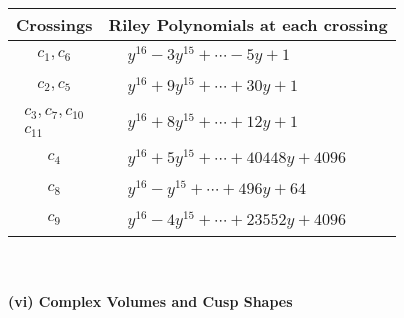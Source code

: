\documentclass[1p]{elsarticle_modified}
\theoremstyle{definition}
\begin{document}
\begin{tabular}{m{50pt}|m{274pt}}
Crossings & \hspace{64pt}Riley Polynomials at each crossing \\
\hline $$\begin{aligned}c_{1},c_{6}\end{aligned}$$&$\begin{aligned}
&y^{16}-3 y^{15}+\cdots-5 y+1
\end{aligned}$\\
\hline $$\begin{aligned}c_{2},c_{5}\end{aligned}$$&$\begin{aligned}
&y^{16}+9 y^{15}+\cdots+30 y+1
\end{aligned}$\\
\hline $$\begin{aligned}c_{3},c_{7},c_{10}\\c_{11}\end{aligned}$$&$\begin{aligned}
&y^{16}+8 y^{15}+\cdots+12 y+1
\end{aligned}$\\
\hline $$\begin{aligned}c_{4}\end{aligned}$$&$\begin{aligned}
&y^{16}+5 y^{15}+\cdots+40448 y+4096
\end{aligned}$\\
\hline $$\begin{aligned}c_{8}\end{aligned}$$&$\begin{aligned}
&y^{16}- y^{15}+\cdots+496 y+64
\end{aligned}$\\
\hline $$\begin{aligned}c_{9}\end{aligned}$$&$\begin{aligned}
&y^{16}-4 y^{15}+\cdots+23552 y+4096
\end{aligned}$\\
\hline
\end{tabular}\\~\\
\newpage\flushleft \textbf{(vi) Complex Volumes and Cusp Shapes}
\end{document}
